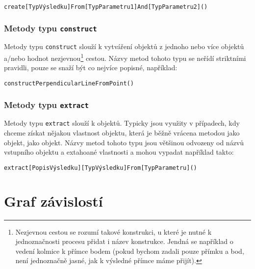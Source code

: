 \texttt{create[TypVýsledku]From[TypParametru1]And[TypParametru2]()}

\subsubsection[Construct]{Metody typu \texttt{construct}}
\label{subsubsec:construct-methods}

Metody typu \texttt{construct} slouží k vytváření objektů z jednoho nebo více objektů a/nebo hodnot nezjevnou\footnote{Nezjevnou cestou se rozumí takové konstrukci, u které je nutné k jednoznačnosti procesu přidat i název konstrukce. Jendná se například o vedení kolmice k přímce bodem (pokud bychom zadali pouze přímku a bod, není jednoznačně jasné, jak k výsledné přímce máme přijít).} cestou.
Názvy metod tohoto typu se neřídí striktními pravidli, pouze se snaží být co nejvíce popisné, například:

\texttt{constructPerpendicularLineFromPoint()}

\subsubsection[Extract]{Metody typu \texttt{extract}}
\label{subsubsec:extract-methods}

Metody typu \texttt{extract} slouží k  objektů.
Typicky jsou využity v případech, kdy chceme získat nějakou vlastnost objektu, která je běžně vrácena metodou jako  objekt, jako  objekt.
Názvy metod tohoto typu jsou většinou odvozeny od názvů vstupního objektu a extahoané vlastnosti a mohou vypadat například takto:

\texttt{extract[PopisVýsledku][TypVýsledku]From[TypParametru]()}

\section{Graf závislostí}
\label{sec:dependency-graph}
